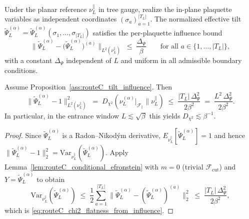 \begin{proposition}\label{ass:routeC_tilt_influence}
Under the planar reference $\nu_L^{\parallel}$ in tree gauge, realize the in-plane plaquette variables as independent coordinates $(\sigma_a)_{a=1}^{|T_L|}$.
The normalized effective tilt $\widetilde{\Psi}_L^{(\alpha)}=\widetilde{\Psi}_L^{(\alpha)}(\sigma_1,\dots,\sigma_{|T_L|})$ satisfies the per-plaquette influence bound
\begin{equation}\label{eq:routeC_tilt_influence_bound}
\big\|\widetilde{\Psi}_L^{(\alpha)}-\big(\widetilde{\Psi}_L^{(\alpha)}\big)^{(a)}\big\|_{L^2(\nu_L^{\parallel})}
\;\le\;
\frac{\Delta_{\Psi}}{\beta}
\qquad\text{for all }a\in\{1,\dots,|T_L|\},
\end{equation}
with a constant $\Delta_{\Psi}$ independent of $L$ and uniform in all admissible boundary conditions.
\end{proposition}


\begin{corollary}\label{cor:routeC_chi2_from_tilt_influences}
Assume Proposition~\ref{ass:routeC_tilt_influence}.
Then
\begin{equation}\label{eq:routeC_chi2_flatness_from_influence}
\big\|\widetilde{\Psi}_L^{(\alpha)}-1\big\|_{L^2(\nu_L^{\parallel})}^2
\;=\;
D_{\chi^2}\!\left(\nu_L^{(\alpha)}\big|_{\mathscr F_{\parallel}}\Big\| \nu_L^{\parallel}\right)
\;\le\;
\frac{|T_L|\,\Delta_{\Psi}^2}{2\beta^2}
\;=\;
\frac{L^2\,\Delta_{\Psi}^2}{2\beta^2}.
\end{equation}
In particular, in the entrance window $L\lesssim\sqrt\beta$ this yields $D_{\chi^2}\lesssim \beta^{-1}$.

\begin{proof}
Since $\widetilde{\Psi}_L^{(\alpha)}$ is a Radon--Nikod\'ym derivative, $E_{\nu_L^{\parallel}}[\widetilde{\Psi}_L^{(\alpha)}]=1$ and hence
$\|\widetilde{\Psi}_L^{(\alpha)}-1\|_2^2=\mathrm{Var}_{\nu_L^{\parallel}}(\widetilde{\Psi}_L^{(\alpha)})$.
Apply Lemma~\ref{lem:routeC_conditional_efronstein} with $m=0$ (trivial $\mathscr F_{\mathrm{cut}}$) and $Y=\widetilde{\Psi}_L^{(\alpha)}$ to obtain
\[
\mathrm{Var}_{\nu_L^{\parallel}}(\widetilde{\Psi}_L^{(\alpha)})
\;\le\;
\frac12\sum_{a=1}^{|T_L|}\big\|\widetilde{\Psi}_L^{(\alpha)}-(\widetilde{\Psi}_L^{(\alpha)})^{(a)}\big\|_2^2
\;\le\;
\frac{|T_L|\,\Delta_{\Psi}^2}{2\beta^2},
\]
which is \eqref{eq:routeC_chi2_flatness_from_influence}.
\end{proof}

\end{corollary}


